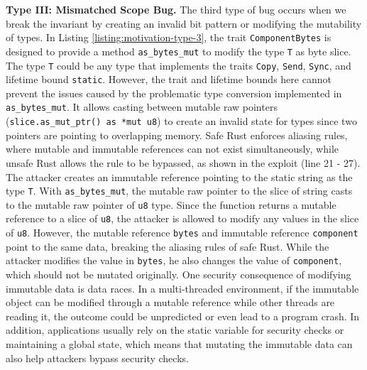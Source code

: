 \vspace{0.05in}
\noindent\textbf{Type III: Mismatched Scope Bug.} The third type of bug occurs when we break the invariant by creating an invalid bit pattern or modifying the mutability of types. In Listing \ref{listing:motivation-type-3}, the trait \texttt{ComponentBytes} is designed to provide a method \texttt{as\_bytes\_mut} to modify the type \texttt{T} as byte slice. The type \texttt{T} could be any type that implements the traits \texttt{Copy}, \texttt{Send}, \texttt{Sync}, and lifetime bound \texttt{static}. However, the trait and lifetime bounds here cannot prevent the issues caused by the problematic type conversion implemented in \texttt{as\_bytes\_mut}. It allows casting between mutable raw pointers (\texttt{slice.as\_mut\_ptr() as *mut u8}) to create an invalid state for types since two pointers are pointing to overlapping memory. Safe Rust enforces aliasing rules, where mutable and immutable references can not exist simultaneously, while unsafe Rust allows the rule to be bypassed, as shown in the exploit (line 21 - 27). The attacker creates an immutable reference pointing to the static string as the type \texttt{T}. With \texttt{as\_bytes\_mut}, the mutable raw pointer to the slice of string casts to the mutable raw pointer of \texttt{u8} type. Since the function returns a mutable reference to a slice of \texttt{u8}, the attacker is allowed to modify any values in the slice of \texttt{u8}. However, the mutable reference \texttt{bytes} and immutable reference \texttt{component} point to the same data, breaking the aliasing rules of safe Rust. While the attacker modifies the value in \texttt{bytes}, he also changes the value of \texttt{component}, which should not be mutated originally. One security consequence of modifying immutable data is data races. In a multi-threaded environment, if the immutable object can be modified through a mutable reference while other threads are reading it, the outcome could be unpredicted or even lead to a program crash. In addition, applications usually rely on the static variable for security checks or maintaining a global state, which means that mutating the immutable data can also help attackers bypass security checks. 




